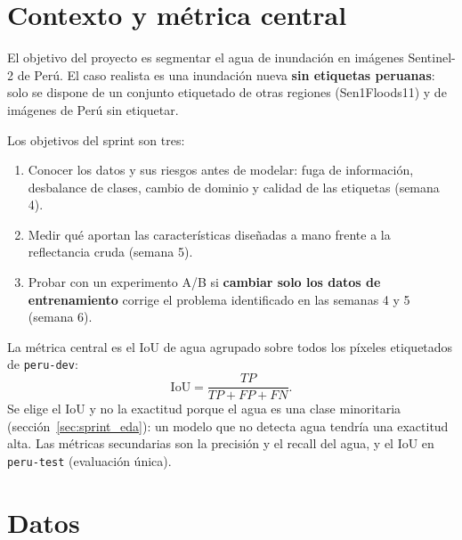 \section{Contexto y métrica central}

El objetivo del proyecto es segmentar el agua de inundación en imágenes Sentinel-2 de Perú. El caso
realista es una inundación nueva \textbf{sin etiquetas peruanas}: solo se dispone de un conjunto
etiquetado de otras regiones (Sen1Floods11) y de imágenes de Perú sin etiquetar.

Los objetivos del sprint son tres:
\begin{enumerate}
    \item Conocer los datos y sus riesgos antes de modelar: fuga de información, desbalance de
    clases, cambio de dominio y calidad de las etiquetas (semana 4).
    \item Medir qué aportan las características diseñadas a mano frente a la reflectancia cruda
    (semana 5).
    \item Probar con un experimento A/B si \textbf{cambiar solo los datos de entrenamiento} corrige
    el problema identificado en las semanas 4 y 5 (semana 6).
\end{enumerate}

La métrica central es el IoU de agua agrupado sobre todos los píxeles etiquetados de
\texttt{peru-\allowbreak{}dev}:
\begin{equation}
    \mathrm{IoU} = \frac{TP}{TP + FP + FN}.
    \label{eq:iou_sprint}
\end{equation}
Se elige el IoU y no la exactitud porque el agua es una clase minoritaria
(sección~\ref{sec:sprint_eda}): un modelo que no detecta agua tendría una exactitud alta. Las
métricas secundarias son la precisión y el recall del agua, y el IoU en \texttt{peru-\allowbreak{}test}
(evaluación única).

\section{Datos}

